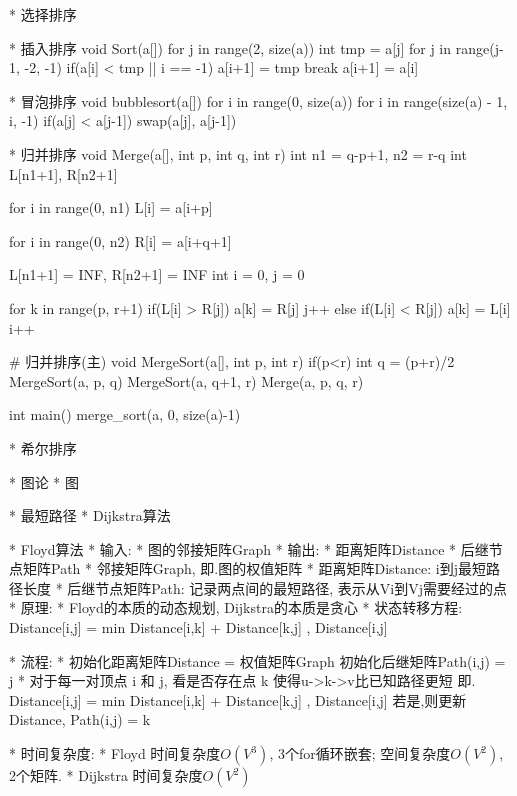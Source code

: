 		* 选择排序

		* 插入排序
			\Codes
				void Sort(a[])
					for j in range(2, size(a))
						int tmp = a[j]
						for j in range(j-1, -2, -1)
							if(a[i] < tmp || i == -1)
								a[i+1] = tmp
								break
							a[i+1] = a[i]

		* 冒泡排序
			\Codes
				void bubblesort(a[])
					for i in range(0, size(a))
						for i in range(size(a) - 1, i, -1)
							if(a[j] < a[j-1])
								swap(a[j], a[j-1])

		* 归并排序
			\Codes
				void Merge(a[], int p, int q, int r)
					int n1 = q-p+1, n2 = r-q
					int L[n1+1], R[n2+1]
				
					for i in range(0, n1)
						L[i] = a[i+p]
				
					for i in range(0, n2)
						R[i] = a[i+q+1]
						
					L[n1+1] = INF, R[n2+1] = INF
					int i = 0, j = 0
				
					for k in range(p, r+1)
						if(L[i] > R[j])
							a[k] = R[j]
							j++
						else if(L[i] < R[j])
							a[k] = L[i]
							i++
				
				# 归并排序(主)
				void MergeSort(a[], int p, int r)
					if(p<r)
						int q = (p+r)/2
						MergeSort(a, p, q)
						MergeSort(a, q+1, r)
						Merge(a, p, q, r)
					
				int main()
					merge_sort(a, 0, size(a)-1)

		* 希尔排序

	* 图论
		* 图

		* 最短路径
			* Dijkstra算法

			* Floyd算法
				* 输入:	* 图的邻接矩阵Graph
				* 输出: * 距离矩阵Distance	* 后继节点矩阵Path
					* 邻接矩阵Graph, 即.图的权值矩阵
					* 距离矩阵Distance: i到j最短路径长度
					* 后继节点矩阵Path: 记录两点间的最短路径, 表示从Vi到Vj需要经过的点
				* 原理:
					* Floyd的本质的动态规划, Dijkstra的本质是贪心
					* 状态转移方程:
						Distance[i,j] = min{ Distance[i,k] + Distance[k,j] , Distance[i,j] }

				* 流程:
					* 初始化距离矩阵Distance = 权值矩阵Graph
						初始化后继矩阵Path(i,j) = j
					* 对于每一对顶点 i 和 j, 看是否存在点 k 使得u->k->v比已知路径更短
							即. Distance[i,j] = min{ Distance[i,k] + Distance[k,j] , Distance[i,j] }
						若是,则更新Distance, Path(i,j) = k
				
			\Property
				* 时间复杂度:
					* Floyd	时间复杂度$O(V^3)$, 3个for循环嵌套; 空间复杂度$O(V^2)$, 2个矩阵.
					* Dijkstra 时间复杂度$O(V^2)$

